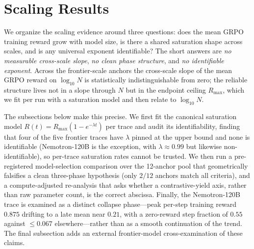 \section{Scaling Results}
\label{sec:p1-results}
We organize the scaling evidence around three questions: does the mean GRPO training reward grow
with model size, is there a shared saturation shape across scales, and is any
universal exponent identifiable? The short answers are \emph{no measurable
cross-scale slope}, \emph{no clean phase structure}, and \emph{no identifiable
exponent}. Across the frontier-scale anchors the cross-scale slope of the mean
GRPO reward on $\log_{10} N$ is statistically indistinguishable from zero; the
reliable structure lives not in a slope through $N$ but in the endpoint ceiling
$R_{\max}$, which we fit per run with a saturation model and then relate to
$\log_{10} N$.

The subsections below make this precise. We first fit the canonical saturation
model $R(t) = R_{\max}(1 - e^{-\lambda t})$ per trace and audit its
identifiability, finding that four of the five frontier traces have $\lambda$
pinned at the upper bound and none is identifiable (Nemotron-120B is the exception,
with $\lambda\!\approx\!0.99$ but likewise non-identifiable), so per-trace saturation
rates cannot be trusted. We then run a pre-registered model-selection comparison over the
12-anchor pool that geometrically falsifies a clean three-phase hypothesis (only
$2/12$ anchors match all criteria), and a compute-adjusted re-analysis that asks
whether a contrastive-yield axis, rather than raw parameter count, is the correct
abscissa. Finally, the Nemotron-120B trace is examined as a distinct collapse
phase---peak per-step training reward $0.875$ drifting to a late mean near $0.21$, with a
zero-reward step fraction of $0.55$ against $\le 0.067$ elsewhere---rather than as a
smooth continuation of the trend. The final subsection adds an external
frontier-model cross-examination of these claims.
